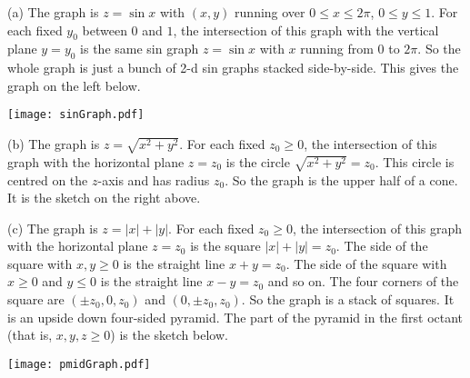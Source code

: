 \begin{solution} (a)
 The graph is $z=\sin x$ with $(x,y)$ running over
$0\le x\le 2\pi$,  $0\le y\le 1$. For each fixed $y_0$ between $0$ and $1$, 
the intersection of this graph with the vertical plane $y=y_0$ is the
same sin graph $z=\sin x$ with $x$ running from $0$ to $2\pi$. So the whole
graph is just a bunch of 2-d sin graphs stacked side-by-side. This gives
the graph on the left below.

\begin{center}
   \texttt{[image: sinGraph.pdf]}\qquad\qquad
\end{center}

(b) 
The graph is $z=\sqrt{x^2+y^2}$. For each fixed $z_0\ge 0$, 
the intersection of this graph with the horizontal plane $z=z_0$ is the
circle $\sqrt{x^2+y^2}=z_0$. This circle is centred on the $z$-axis
and has radius $z_0$. So the graph is the upper half of a cone. It is the
sketch on the right above.

(c) 
The graph is $z=|x|+|y|$. For each fixed $z_0\ge 0$, 
the intersection of this graph with the horizontal plane $z=z_0$ is the
square $|x|+|y|=z_0$. The side of the square with $x,y\ge 0$ is the straight
line $x+y=z_0$. The side of the square with $x\ge 0$ and $y\le 0$ is 
the straight line $x-y=z_0$ and so on. The four corners of the square are
$(\pm z_0,0,z_0)$ and $(0, \pm z_0,z_0)$.  So the graph is a stack of squares.
It is an upside down four-sided pyramid. The part of the pyramid in the
first octant (that is, $x,y,z\ge 0$) is the sketch below.

\begin{center}
   \texttt{[image: pmidGraph.pdf]}\qquad\qquad
\end{center}

\end{solution}




